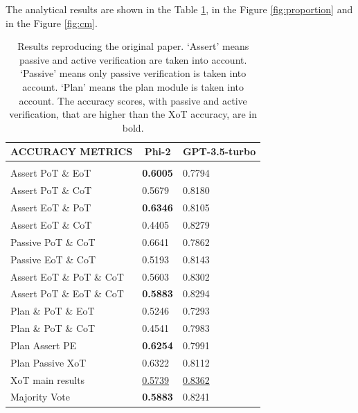 \documentclass[10pt]{article} %
\begin{document}
The analytical results are shown in the Table \ref{original-results}, in the Figure \ref{fig:proportion} and in the Figure \ref{fig:cm}.

\begin{table}[t]
  \caption{Results reproducing the original paper. `Assert' means passive and active verification are taken into account. `Passive' means only passive verification is taken into account. `Plan' means the plan module is taken into account. The accuracy scores, with passive and active verification, that are higher than the XoT accuracy, are in bold.}
  \label{original-results}
  \begin{center}
  \begin{tabular}{lll}
  \multicolumn{1}{c}{\bf ACCURACY METRICS}  &\multicolumn{1}{c}{\bf Phi-2}  &\multicolumn{1}{c}{\bf GPT-3.5-turbo}
  \\ \hline \\
  Assert PoT \& EoT                         &\textbf{0.6005}                &0.7794\\
  Assert PoT \& CoT                         &0.5679                         &0.8180\\
  Assert EoT \& PoT                         &\textbf{0.6346}                &0.8105\\
  Assert EoT \& CoT                         &0.4405                         &0.8279\\
  Passive PoT \& CoT                        &0.6641                         &0.7862\\
  Passive EoT \& CoT                        &0.5193                         &0.8143\\
  Assert EoT \& PoT \& CoT                  &0.5603                         &0.8302\\
  Assert PoT \& EoT \& CoT                  &\textbf{0.5883}                &0.8294\\
  Plan \& PoT \& EoT                        &0.5246                         &0.7293\\
  Plan \& PoT \& CoT                        &0.4541                         &0.7983\\
  Plan Assert PE                            &\textbf{0.6254}                &0.7991\\
  Plan Passive XoT                          &0.6322                         &0.8112\\
  XoT main results                          &\underline{0.5739}             &\underline{0.8362}\\
  Majority Vote                             &\textbf{0.5883}                &0.8241\\
  \end{tabular}
  \end{center}
  \end{table}
\end{document}
